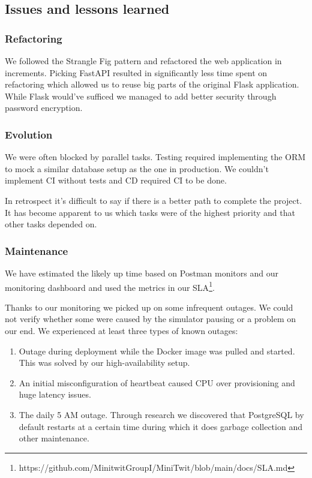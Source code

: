 \documentclass{article}
\begin{document}
\subsection{Issues and lessons learned}

\subsubsection{Refactoring} 

We followed the Strangle Fig pattern and refactored the web application in increments. Picking FastAPI resulted in significantly less time spent on refactoring which allowed us to reuse big parts of the original Flask application. While Flask would've sufficed we managed to add better security through password encryption. 

\subsubsection{Evolution}

We were often blocked by parallel tasks. Testing required implementing the ORM to mock a similar database setup as the one in production. We couldn't implement CI without tests and CD required CI to be done. 

In retrospect it's difficult to say if there is a better path to complete the project. It has become apparent to us which tasks were of the highest priority and that other tasks depended on. 

\subsubsection{Maintenance}

We have estimated the likely up time based on Postman monitors and our monitoring dashboard and used the metrics in our SLA\footnote{https://github.com/MinitwitGroupI/MiniTwit/blob/main/docs/SLA.md}. 

Thanks to our monitoring we picked up on some infrequent outages. We could not verify whether some were caused by the simulator pausing or a problem on our end. We experienced at least three types of known outages:

\begin{enumerate}
    \item Outage during deployment while the Docker image was pulled and started. This was solved by our high-availability setup. 
    \item An initial misconfiguration of heartbeat caused CPU over provisioning and huge latency issues.
    \item The daily 5 AM outage. Through research we discovered that PostgreSQL by default restarts at a certain time during which it does garbage collection and other maintenance. 
\end{enumerate}
\end{document}
